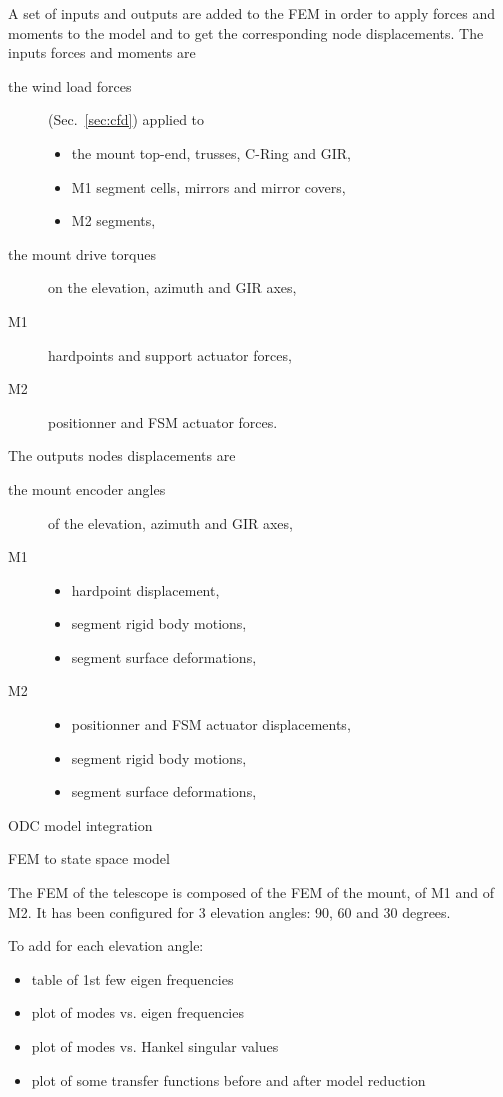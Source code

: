 \documentclass{gmto}
\begin{document}
A set of inputs and outputs are added to the FEM in order to apply
forces and moments to the model and to get the corresponding node displacements.
The inputs forces and moments are
\begin{description}
\item[the wind load forces](Sec.~\ref{sec:cfd}) applied to
  \begin{itemize}
  \item   the mount top-end, trusses, C-Ring and GIR,
  \item  M1 segment cells, mirrors and mirror covers,
  \item  M2 segments,
  \end{itemize}
\item[the mount drive torques] on the elevation, azimuth and GIR axes,
\item[M1] hardpoints and support actuator forces,
\item[M2] positionner and FSM actuator forces.
\end{description}
The outputs nodes displacements are
\begin{description}
\item[the mount encoder angles] of the elevation, azimuth and GIR axes,
\item[M1]
  \begin{itemize}
  \item hardpoint displacement,
  \item segment rigid body motions,
  \item segment surface deformations,
  \end{itemize}
\item[M2]
  \begin{itemize}
  \item positionner and FSM actuator displacements,
  \item segment rigid body motions,
  \item segment surface deformations,
  \end{itemize}
\end{description}

ODC model integration\cite{mount_pdr_iv}

FEM to state space model\cite{ss2fem_Christoph2020}

The FEM of the telescope is composed of the FEM of the mount, of M1 and of M2.
It has been configured for 3 elevation angles: 90, 60 and 30 degrees.

To add for each elevation angle:
\begin{itemize}
\item table of 1st few eigen frequencies
\item plot of modes vs. eigen frequencies
\item plot of modes vs. Hankel  singular values
\item plot of some transfer functions before and after model reduction
\end{itemize}
\end{document}

